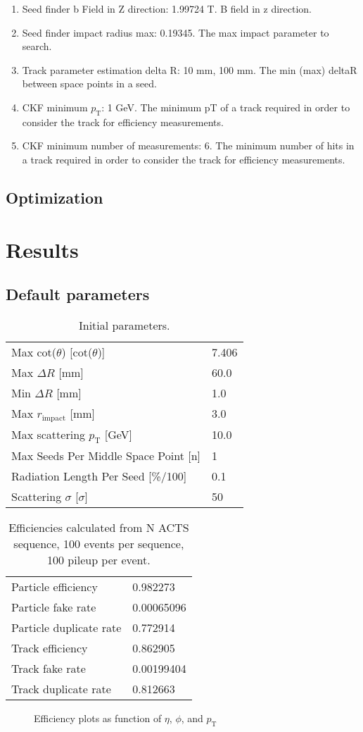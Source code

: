 \documentclass{article}
\newcommand{\pic}[2]{\beg{center}{\texttt{[image: \#2]}}}
\newcommand{\figpic}[3]{
\begin{figure}[H]
\begin{center}
\pic{#1}{#2}
\caption{#3}
\end{center}
\end{figure}}
\newcommand{\pt}[0]{p_\textrm{T}}
\newcommand{\figtab}[3]{
\begin{table}[H]
\begin{tabular}{#1}
#2
\end{tabular}
\caption{#3}
\end{table}}
\begin{document}
\begin{enumerate}
\item Seed finder b Field in Z direction: 1.99724 T. B field in z direction.
\item Seed finder impact radius max: 0.19345. The max impact parameter to search.
\item Track parameter estimation delta R: 10 mm, 100 mm. The min (max) deltaR between space points in a seed.
\item CKF minimum $\pt$: 1 GeV. The minimum pT of a track required in order to consider the track for efficiency measurements.
\item CKF minimum number of measurements: 6. The minimum number of hits in a track required in order to consider the track for efficiency measurements.
\end{enumerate}

\subsection{\label{b87dfa0}Optimization}
\section{Results}
\subsection{Default parameters}
\figtab{l l}{Max \textrm{cot}($\theta$) [\textrm{cot}($\theta$)] & 7.406\\
Max $\Delta R$ [mm] & 60.0\\
Min $\Delta R$ [mm]  & 1.0\\
Max $r_\textrm{impact}$ [mm] & 3.0\\
Max scattering $p_{\textrm{T}}$ [GeV] & 10.0\\
Max Seeds Per Middle Space Point [n] & 1\\
Radiation Length Per Seed [\%/100] & 0.1\\
Scattering $\sigma$ [$\sigma$] & 50
}{\label{192837a}Initial parameters.}
\figtab{l l}{
Particle efficiency &0.982273\\
Particle fake rate &0.00065096\\
Particle duplicate rate &0.772914\\
Track efficiency &0.862905\\
Track fake rate &0.00199404\\
Track duplicate rate &0.812663
}{Efficiencies calculated from N ACTS sequence, 100 events per sequence, 100 pileup per event.}
\figpic{9cm}{4.png}{Efficiency plots as function of $\eta$, $\phi$, and $\pt$}
\end{document}
